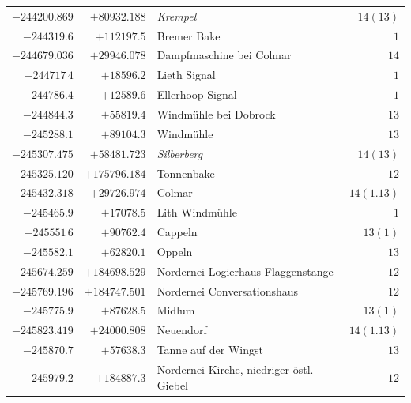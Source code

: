 \begin{center}
\begin{tabular}{r|r|p{170pt}|r}
\(-244200.869\)&\(+80932.188\)&\textit{Krempel}&\(14(13)\)\\
\(-244319.6\)&\(+112197.5\)&Bremer Bake&\(1\)\\
\(-244679.036\)&\(+29946.078\)&Dampfmaschine bei Colmar&\(14\)\\
\(-244717\,4\)&\(+18596.2\)&Lieth Signal&\(1\)\\
\(-244786.4\)&\(+12589.6\)&Ellerhoop Signal&\(1\)\\
\(-244844.3\)&\(+55819.4\)&Windmühle bei Dobrock&\(13\)\\
\(-245288.1\)&\(+89104.3\)&Windmühle&\(13\)\\
\(-245307.475\)&\(+58481.723\)&\textit{Silberberg}&\(14(13)\)\\
\(-245325.120\)&\(+175796.184\)&Tonnenbake&\(12\)\\
\(-245432.318\)&\(+29726.974\)&Colmar&\(14(1.13)\)\\
\(-245465.9\)&\(+17078.5\)&Lith Windmühle&\(1\)\\
\(-245551\,6\)&\(+90762.4\)&Cappeln&\(13(1)\)\\
\(-245582.1\)&\(+62820.1\)&Oppeln&\(13\)\\
\(-245674.259\)&\(+184698.529\)&Nordernei Logierhaus-Flaggenstange&\(12\)\\
\(-245769.196\)&\(+184747.501\)&Nordernei Conversationshaus&\(12\)\\
\(-245775.9\)&\(+87628.5\)&Midlum&\(13(1)\)\\
\(-245823.419\)&\(+24000.808\)&Neuendorf&\(14(1.13)\)\\
\(-245870.7\)&\(+57638.3\)&Tanne auf der Wingst&\(13\)\\
\(-245979.2\)&\(+184887.3\)&Nordernei Kirche, niedriger östl. Giebel&\(12\)\\
\hline\end{tabular}\endgroup\end{center}
